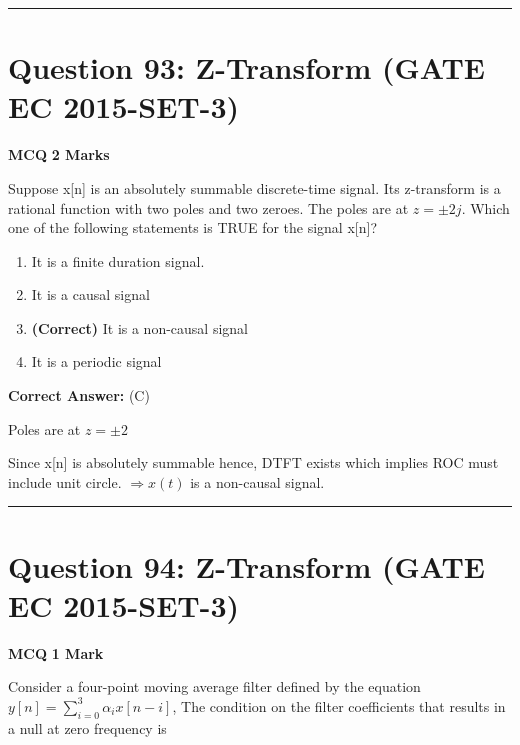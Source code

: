 \documentclass[11pt,a4paper]{article}
\begin{document}
\vspace{1.5em}
\hrule
\vspace{1.5em}

\section*{Question 93: Z-Transform (GATE EC 2015-SET-3)}
\noindent \textbf{\color{primary}MCQ} \hfill \textbf{\color{secondary}2 Marks}


\noindent Suppose x[n] is an absolutely summable discrete-time signal. Its z-transform is a rational function with two poles and two zeroes. The poles are at $z = \pm 2j$. Which one of the following statements is TRUE for the signal x[n]?


\begin{enumerate}[label=(\Alph*)]
    \item It is a finite duration signal.
    \item It is a causal signal
    \item \textbf{(Correct)} It is a non-causal signal
    \item It is a periodic signal
\end{enumerate}

\noindent \textbf{Correct Answer:} (C)

\begin{tcolorbox}[solbox, title=Detailed Solution -- Question 93]
Poles are at  $z=\pm 2$

Since  x[n]  is absolutely summable hence, DTFT
exists which implies ROC must include unit circle. 
$\Rightarrow x(t)$ is a non-causal signal.
\end{tcolorbox}

\vspace{1.5em}
\hrule
\vspace{1.5em}

\section*{Question 94: Z-Transform (GATE EC 2015-SET-3)}
\noindent \textbf{\color{primary}MCQ} \hfill \textbf{\color{secondary}1 Mark}


\noindent Consider a four-point moving average filter defined by the equation $y[n]=\sum_{i=0}^{3}\alpha _{i} x[n-i]$,
  The condition on the filter coefficients that results in a null at zero frequency is
\end{document}
